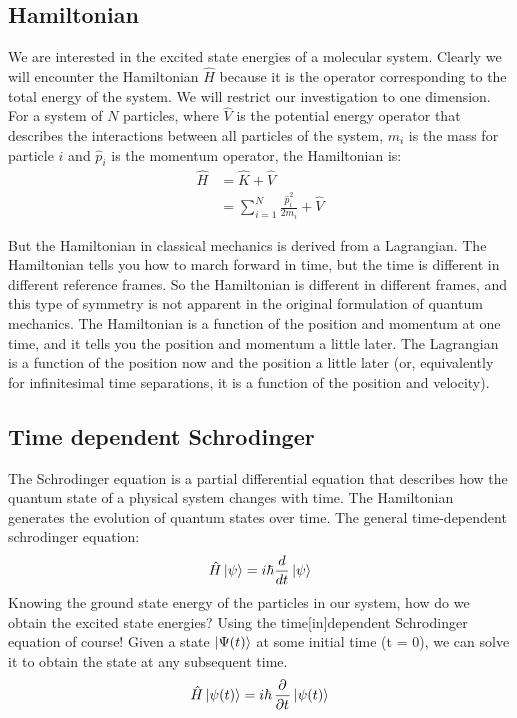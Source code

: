 \documentclass[12pt,letterpaper,oneside,final,titlepage]{article}               %
\numberwithin{equation}{section} %
\begin{document}
\newpage

\subsection{Hamiltonian}
We are interested in the excited state energies of a molecular system.
Clearly we will encounter the Hamiltonian $\hat{H}$ because it is the operator corresponding to the total energy of the system.
We will restrict our investigation to one dimension. 
For a system of $N$ particles, where $\hat{V}$ is the potential energy operator that describes the interactions between 
all particles of the system, $m_{i}$ is the mass for particle $i$ and $\hat{p}_{i}$ is the momentum operator, the Hamiltonian is:
\begin{align}
    \hat{H} &= \hat{K} + \hat{V}
    \\      &= \sum_{i=1}^{N}\frac{\hat{p}_{i}^2}{2m_{i}} + \hat{V}
\end{align}

But the Hamiltonian in classical mechanics is derived from a Lagrangian. 
The Hamiltonian tells you how to march forward in time, but the time is different in different reference frames. 
So the Hamiltonian is different in different frames, and this type of symmetry is not apparent in the original formulation of quantum mechanics.
The Hamiltonian is a function of the position and momentum at one time, and it tells you the position and momentum a little later. 
The Lagrangian is a function of the position now and the position a little later (or, equivalently for infinitesimal time separations, it is a function of the position and velocity). 


\subsection{Time dependent Schrodinger}
The Schrodinger equation is a partial differential equation that describes how the quantum state of a physical system changes with time. 
The Hamiltonian generates the evolution of quantum states over time. 
The general time-dependent schrodinger equation:
\begin{equation}
    \hat{H}\ket{\psi} = i\hbar\frac{d}{dt}\ket{\psi}
\end{equation}
Knowing the ground state energy of the particles in our system, how do we obtain the excited state energies? 
Using the time[in]dependent Schrodinger equation of course! 
Given a state $\ket{\Psi(t)}$ at some initial time (t = 0), we can solve it to obtain the state at any subsequent time.
\begin{equation}
    \hat{H}\ket{\psi(t)} = i\hbar\dpd{}{t}\ket{\psi(t)}  
\end{equation}
\end{document}
